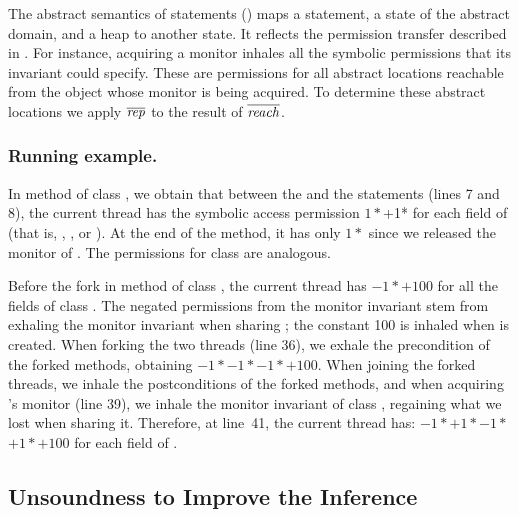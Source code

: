 \documentclass{llncs}
\begin{document}
The abstract semantics of statements ()
maps a statement, a state of the abstract domain, and a heap to
another state. It reflects the permission transfer described in
.  For instance, acquiring a monitor inhales all
the symbolic permissions that its invariant could specify. These are
permissions for all abstract locations reachable from the object whose
monitor is being acquired. To determine these abstract locations we apply 
$\overline{\mathit{rep}}$ to the result of $\overline{\mathit{reach}}$.


\goup
\goup
\subsubsection{Running example.}  

In method
 of class , we obtain that between the
 and the  statements (lines 7
and 8), the current thread has the symbolic access permission
$1*$+1*
for each field  of  (that is, , , or ). At the end of the method, it has only
$1*$
since we released the monitor of . The permissions for
class  are analogous.


Before the fork in method  of class
, the current thread has
$-1*$$+100$ for all the fields  of class
. The negated permissions from the monitor invariant
stem from exhaling the monitor invariant when sharing ;
the constant 100 is inhaled when  is created.  When
forking the two threads (line 36), we exhale the precondition of the
forked methods, obtaining
$-1*$$-1*$$-1*$$+100$.
When joining the forked threads, we inhale the postconditions of the
forked methods, and when acquiring 's monitor (line 39), we 
inhale the monitor invariant of class , regaining what we
lost when sharing it. Therefore, at line~41, the current thread has:
$-1*$$+1*$$-1*$$+1*$$+100$ for
each field  of .

\goup
\subsection{Unsoundness to Improve the Inference}
\goup
\end{document}
